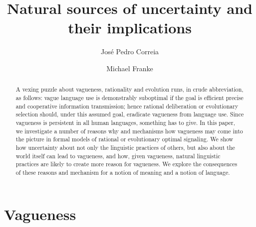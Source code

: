 \documentclass[a4paper]{article}
\begin{document}
\title{Natural sources of uncertainty and their implications}
\author{Jos\'e Pedro Correia \and Michael Franke}
\date{}

\maketitle

\begin{abstract}
A vexing puzzle about vagueness, rationality and evolution runs, in crude abbreviation, as follows: vague language use is demonstrably suboptimal if the goal is efficient precise and cooperative information transmission; hence rational deliberation or evolutionary selection should, under this assumed goal, eradicate vagueness from language use.
Since vagueness is persistent in all human languages, something has to give.
In this paper, we investigate a number of reasons why and mechanisms how vagueness may come into the picture in formal models of rational or evolutionary optimal signaling.
We show how uncertainty about not only the linguistic practices of others, but also about the world itself can lead to vagueness, and how, given vagueness, natural linguistic practices are likely to create more reason for vagueness.
We explore the consequences of these reasons and mechanism for a notion of meaning and a notion of language.
\end{abstract}

\tableofcontents

\section{Vagueness}
\label{sec:vagueness}
\end{document}
